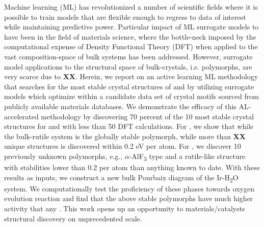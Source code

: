 %



%
Machine learning (ML) has revolutionized a number of scientific fields where it is possible to train models that are flexible enough to regress to data of interest while maintaining predictive power.
%
Particular impact of ML surrogate models to  have been in the field of materials science,
where the bottle-neck imposed by the computational expense of Density Functional Theory (DFT) when applied to the vast composition-space of bulk systems has been addressed.
%
However, surrogate model applications to the structural space of bulk-crystals, i.e. polymorphs, are very scarce due to {\bf XX}.
%
Herein, we report on an active learning ML methodology that searches for the most stable crystal structures of \IrOtwo and \IrOthree by utilizing surrogate models which optimize within a candidate data set of crystal motifs sourced from publicly available materials databases.
%
We demonstrate the efficacy of this AL-accelerated methodology by discovering 70 percent of the 10 most stable crystal structures for \IrOtwo and \IrOthree with less than 50 DFT calculations.
%
For \IrOtwo, we show that while the bulk-rutile system is the globally stable polymorph,
while more than {\bf XX} unique structures is discovered within 0.2 eV per atom.
For \IrOthree, we discover 10 previously unknown polymorphs, e.g.,
$\alpha$-AlF\textsubscript{3} type and a rutile-like \IrOthree structure with stabilities lower than 0.2 per atom than anything known to date.
With these results as inputs, we construct a new bulk Pourbaix diagram of the Ir-H\textsubscript{2}O system.
%
We computationally test the proficiency of these phases towards oxygen evolution reaction and find that the above stable \IrOthree polymorphs have much higher activity that any \IrOtwo.
%
This work opens up an opportunity to materials/catalysts structural discovery on unprecedented scale.
